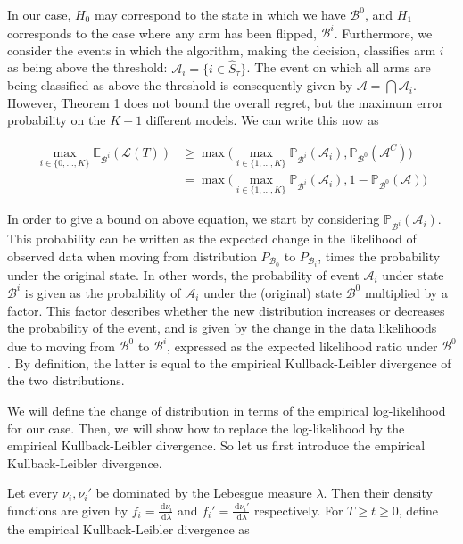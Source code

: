 \documentclass[12pt,]{article}
\newcommand{\der}{\,\text{d}}
\begin{document}
In our case, \(H_0\) may correspond to the state in which we have
\(\mathcal{B}^0\), and \(H_1\) corresponds to the case where any arm has
been flipped, \(\mathcal{B}^i\). Furthermore, we consider the events in
which the algorithm, making the decision, classifies arm \(i\) as being
above the threshold: \(\mathcal{A}_i = \{i \in \hat{S}_\tau\}\). The
event on which all arms are being classified as above the threshold is
consequently given by \(\mathcal{A} = \bigcap \mathcal{A}_i\). However,
Theorem 1 does not bound the overall regret, but the maximum error
probability on the \(K+1\) different models. We can write this now as

\begin{align}
\max_{i \in \{0, \dots, K\}} \mathbb{E}_{\mathcal{B}^i} (\mathcal{L}(T)) & \geq \max \big( \max_{i \in \{1, \dots, K\}} \mathbb{P}_{\mathcal{B}^i}(\mathcal{A}_i), \mathbb{P}_{\mathcal{B}^0}(\mathcal{A}^C) \big) \\
& = \max \big( \max_{i \in \{1, \dots, K\}} \mathbb{P}_{\mathcal{B}^i}(\mathcal{A}_i), 1 - \mathbb{P}_{\mathcal{B}^0}(\mathcal{A}) \big) \label{LocatelliTheorem1ExpRegret}
\end{align}

In order to give a bound on above equation, we start by considering
\(\mathbb{P}_{\mathcal{B}^i}(\mathcal{A}_i)\). This probability can be
written as the expected change in the likelihood of observed data when
moving from distribution \(P_{\mathcal{B}_0}\) to \(P_{\mathcal{B}_i}\),
times the probability under the original state. In other words, the
probability of event \(\mathcal{A}_i\) under state \(\mathcal{B}^i\) is
given as the probability of \(\mathcal{A}_i\) under the (original) state
\(\mathcal{B}^0\) multiplied by a factor. This factor describes whether
the new distribution increases or decreases the probability of the
event, and is given by the change in the data likelihoods due to moving
from \(\mathcal{B}^0\) to \(\mathcal{B}^i\), expressed as the expected
likelihood ratio under \(\mathcal{B}^0\). By definition, the latter is
equal to the empirical Kullback-Leibler divergence of the two
distributions.

We will define the change of distribution in terms of the empirical
log-likelihood for our case. Then, we will show how to replace the
log-likelihood by the empirical Kullback-Leibler divergence. So let us
first introduce the empirical Kullback-Leibler divergence.

Let every \(\nu_i, \nu_i'\) be dominated by the Lebesgue measure
\(\lambda\). Then their density functions are given by
\(f_i = \frac{\der \nu_i}{\der \lambda}\) and
\(f_i' = \frac{\der \nu_i'}{\der \lambda}\) respectively. For
\(T \geq t \geq 0\), define the empirical Kullback-Leibler divergence as
\end{document}
